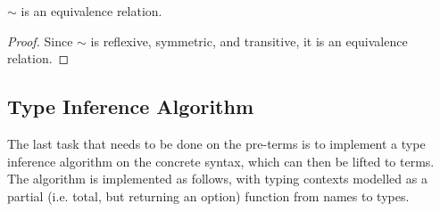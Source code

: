 \begin{theorem}
\(\sim\) is an equivalence relation.
\end{theorem}
\begin{proof}
Since \(\sim\) is reflexive, symmetric, and transitive, it is an equivalence relation.
\end{proof}

\subsection{Type Inference Algorithm}
\label{sec:type-inference}
The last task that needs to be done on the pre-terms is to implement a type inference algorithm on the concrete syntax, which can then be lifted to terms.
The algorithm is implemented as follows, with typing contexts modelled as a partial (i.e. total, but returning an option) function from names to types.

